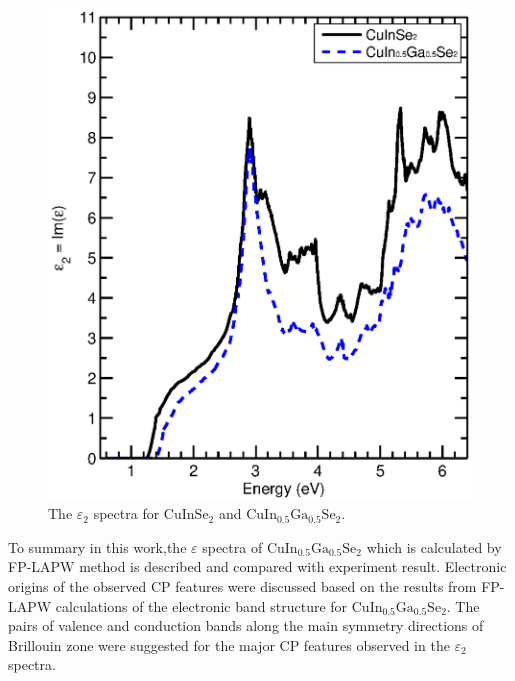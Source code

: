 \documentclass[a4paper, 12pt, titlepage,oneside,drop]{kthesis}
\begin{document}
\begin{figure}[H]
\begin{center}
\includegraphics[scale=0.7]{thesis2.eps}
\end{center}
\caption{The $\varepsilon_2$ spectra for ${\mathrm{ CuInSe_2}}$ and $\mathrm {CuIn_{0.5}Ga_{0.5}Se_2}$. }
\label{ccccc}
\end{figure}

To summary in this work,the $\varepsilon$ spectra of $\mathrm {CuIn_{0.5}Ga_{0.5}Se_2}$ which is calculated by FP-LAPW method is described and compared with experiment
result. Electronic origins of the observed CP features
were discussed based on the results from FP-LAPW calculations of the electronic band structure for $\mathrm {CuIn_{0.5}Ga_{0.5}Se_2}$. The pairs of valence and conduction bands along 
the main symmetry directions of Brillouin zone were suggested for the major CP features observed in the $\varepsilon_2$ spectra.
\end{document}
